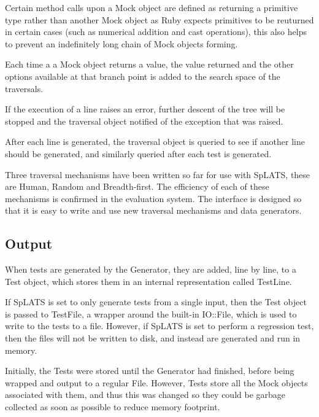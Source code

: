     Certain method calls upon a Mock object are defined as returning a primitive
type rather than another Mock object as Ruby expects primitives to be reuturned
in certain cases (such as numerical addition and cast operations), this also
helps to prevent an indefinitely long chain of Mock objects forming.

    Each time a a Mock object returns a value, the value returned and the other
options available at that branch point is added to the search space of the
traversals.

    If the execution of a line raises an error, further descent of the tree will
be stopped and the traversal object notified of the exception that was raised.

    After each line is generated, the traversal object is queried to see if
another line should be generated, and similarly queried after each test is
generated.

    Three traversal mechanisms have been written so far for use with SpLATS, these
are Human, Random and Breadth-first. The efficiency of each of these mechanisms
is confirmed in the evaluation system. The interface is designed so that it is
easy to write and use new traversal mechanisms and data generators.

  \subsection{Output}
    When tests are generated by the Generator, they are added, line by line, to a Test object, which stores them in an internal representation called TestLine.
    
    If SpLATS is set to only generate tests from a single input, then the Test object is passed to TestFile, a wrapper around the built-in IO::File, which is used to write to the tests to a file.
    However, if SpLATS is set to perform a regression test, then the files will not be written to disk, and instead are generated and run in memory. 
    
    Initially, the Tests were stored until the Generator had finished, before being wrapped and output to a regular File.
    However, Tests store all the Mock objects associated with them, and thus this was changed so they could be garbage collected as soon as possible to reduce memory footprint.
    
    
